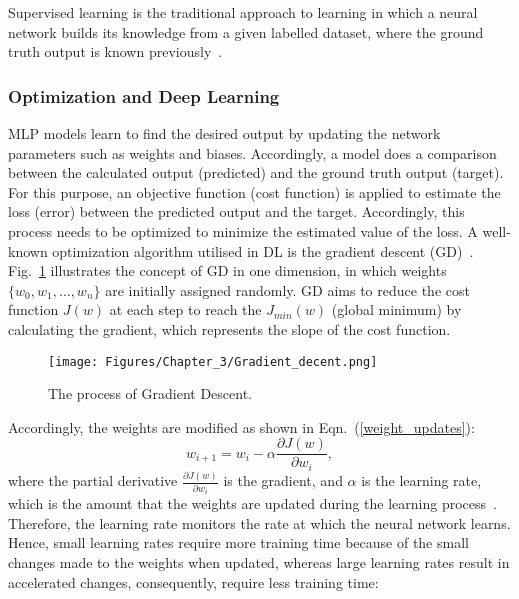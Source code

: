 Supervised learning is the traditional approach to learning in which a neural network builds its knowledge from a given labelled dataset, where the ground truth output is known previously~\cite{Lecun2015}.

\subsubsection{Optimization and Deep Learning}
MLP models learn to find the desired output by updating the network parameters such as weights and biases.
Accordingly, a model does a comparison between the calculated output (predicted) and the ground truth output (target).
For this purpose, an objective function (cost function) is applied to estimate the loss (error) between the predicted output and the target.
Accordingly, this process needs to be optimized to minimize the estimated value of the loss.
A well-known optimization algorithm utilised in DL is the gradient descent (GD)~\cite{Lecun2015}.
Fig.~\ref{fig:GD} illustrates the concept of GD in one dimension, in which weights \(\{w_0,w_1,\dots,w_n\}\) are initially assigned randomly.
GD aims to reduce the cost function \(J(w)\) at each step to reach the \(J_{min}(w)\) (global minimum) by calculating the gradient, which represents the slope of the cost function.
\begin{figure}[!ht]
	\begin{center}
		\centering
		\texttt{[image: Figures/Chapter\_3/Gradient\_decent.png]}
	\end{center}
	\caption{The process of Gradient Descent.} 
	\label{fig:GD}
\end{figure}
Accordingly, the weights are modified as shown in Eqn.~(\ref{weight_updates}):
\begin{equation}
	w_{i+1}= w_{i} -\alpha \frac{\partial J(w)}{\partial w_i}, 
	\label{weight_updates}
\end{equation}
where the partial derivative \(\frac{\partial J(w)}{\partial w_i}\) is the gradient, and \(\alpha \) is the learning rate, which is the amount that the weights are updated during the learning process~\cite{Russell2010}.
Therefore, the learning rate monitors the rate at which the neural network learns.
Hence, small learning rates require more training time because of the small changes made to the weights when updated, whereas large learning rates result in accelerated changes, consequently, require less training time:

